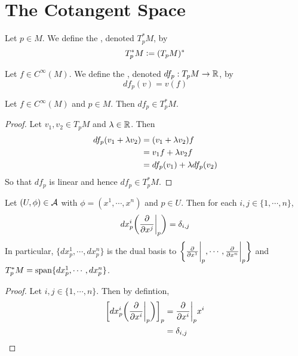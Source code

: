\documentclass{book}
\begin{document}
	
	
	
	
	
	
	
	
	
	
	
	
	
	
	\newpage
	\section{The Cotangent Space}	
	
	
	\begin{defn}
	Let $p \in M$. We define the , denoted $T^*_pM$, by $$T^*_pM \vcentcolon= (T_pM)^*$$
	\end{defn}
	
	\begin{defn}
	Let $f \in C^{\infty}(M)$. We define the , denoted $df_p:T_pM \rightarrow \mathbb{R}$, by $$df_p(v) = v(f)$$
	\end{defn}
	
	\begin{ex}
	Let $f \in C^{\infty}(M)$ and $p \in M$. Then $df_p \in T^*_pM$.
	\end{ex}
	
	\begin{proof}
	Let $v_1, v_2 \in T_pM$ and $\lambda \in \mathbb{R}$. Then 
	\begin{align*}
	df_p(v_1 + \lambda v_2) 
	&= (v_1 + \lambda v_2) f \\
	&= v_1 f + \lambda v_2 f \\
	&= df_p(v_1) + \lambda df_p(v_2)
	\end{align*}
	So that $df_p$ is linear and hence $df_p \in T^*_pM$.
	\end{proof}
	
	\begin{ex}
		Let $(U, \phi) \in \mathcal{A}$ with $\phi = (x^1, \cdots, x^n)$ and $p \in U$. Then for each $i,j \in \{1, \cdots, n\}$, $$dx^i_p \bigg(\frac{\partial }{\partial x^j} \bigg|_p \bigg) = \delta_{i,j}$$ 
		In particular, $\{dx^1_p, \cdots, dx^n_p \}$ is the dual basis to $\bigg \{ \frac{\partial}{\partial x^1} \bigg|_p, \cdots, \frac{\partial}{\partial x^n} \bigg|_p \bigg \}$ and $T_p^*M = \operatorname{span}\{dx^1_p, \cdots, dx^n_p\}$.
	\end{ex}

	\begin{proof}
		Let $i,j \in \{1, \cdots, n\}$. Then  by defintion,
		\begin{align*}
			\bigg[ dx^i_p \bigg (\frac{\partial}{\partial x^i} \bigg|_p \bigg ) \bigg]_p 
			&= \frac{\partial}{\partial x^i} \bigg|_p x^i \\
			&= \delta_{i,j} \\
		\end{align*}
	\end{proof}
	
\end{document}
